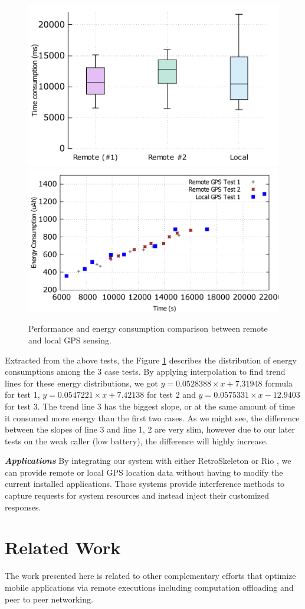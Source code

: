 \documentclass{sig-alternate}[10pt]
\begin{document}
\begin{figure}
	\centering
		\includegraphics[width=.42\textwidth]{data/gps_perf.pdf}
		\includegraphics[width=.47\textwidth]{data/gps_energy_full.pdf}
	\caption{Performance and energy consumption comparison between remote and local GPS sensing.}
	\label{fig:gps_perf}
\end{figure}

Extracted from the above tests, the Figure \ref{fig:gps_perf} describes the distribution of energy consumptions among the 3 case tests. By applying interpolation to find trend lines for these energy distributions, we got $y = 0.0528388 \times x + 7.31948$ formula for test 1, $y = 0.0547221 \times x + 7.42138$ for test 2 and $y = 0.0575331 \times x - 12.9403$ for test 3. The trend line 3 has the biggest slope, or at the same amount of time it consumed more energy than the first two cases. As we might see, the difference between the slopes of line 3 and line 1, 2 are very slim, however due to our later tests on the weak caller (low battery), the difference will highly increase. 

\textbf{\emph{Applications}}
By integrating our system with either RetroSkeleton \cite{retro-skel} or Rio \cite{rio}, we can provide remote or local GPS location data without having to modify the current installed applications. Those systems provide interference methods to capture requests for system resources and instead inject their customized responses. 

\section{Related Work}
\label{sec:related}
The work presented here is related to other complementary efforts that optimize mobile applications via remote executions including computation offloading and peer to peer networking.
\end{document}

